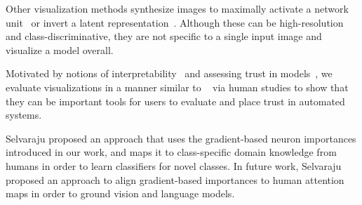 Other visualization methods synthesize images to maximally activate a network unit~\cite{simonyan_arxiv13,erhan2009visualizing} or invert a latent representation~\cite{mahendran2016visualizing,dosovitskiy_cvpr16}.
Although these can be high-resolution and class-discriminative,
they are not specific
to a single input image and visualize a model overall.


\noindent{}
Motivated by notions of interpretability~\cite{lipton_arxiv16} and assessing trust in models~\cite{lime_sigkdd16}, we evaluate \gcam{} visualizations in a manner similar to ~\cite{lime_sigkdd16} via human studies to show that they can be important tools for users to evaluate and place trust in automated systems.

\noindent{}
 Selvaraju \etal \cite{niwt} proposed an approach that uses the gradient-based neuron importances introduced in our work, and maps it to class-specific domain knowledge from humans in order to learn classifiers for novel classes. In future work, Selvaraju \etal \cite{hint} proposed an approach to align gradient-based importances to human attention maps in order to ground vision and language models. 





